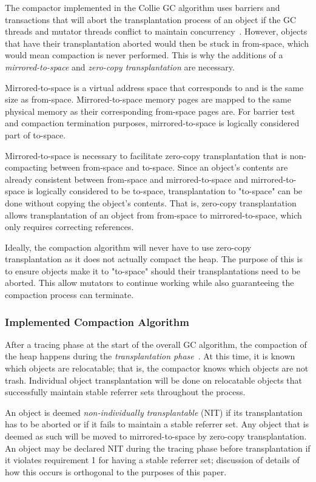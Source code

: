 \documentclass{sig-alternate}
\begin{document}
The compactor implemented in the Collie GC algorithm uses barriers 
and transactions that will abort the transplantation process of an object if the
GC threads and mutator threads conflict to maintain concurrency~\cite{Iyengar:Collie}.
However, objects that have their transplantation aborted would then be stuck
in from-space, which would mean compaction is never performed. This is why
the additions of a \emph{mirrored-to-space} and \emph{zero-copy transplantation} are necessary.

Mirrored-to-space is a virtual address space that corresponds to and is the same
size as from-space. Mirrored-to-space memory pages are mapped to the same physical
memory as their corresponding from-space pages are. For barrier test and compaction 
termination purposes, mirrored-to-space is logically considered part of to-space.

Mirrored-to-space is necessary to facilitate zero-copy transplantation that is 
non-compacting between from-space and to-space. Since an object's contents are 
already consistent between from-space and mirrored-to-space and mirrored-to-space
is logically considered to be to-space, transplantation to "to-space"
can be done without copying the object's contents. That is, zero-copy transplantation
allows transplantation of an object from from-space to mirrored-to-space, which only
requires correcting references.

Ideally, the compaction algorithm will never have to use zero-copy transplantation
as it does not actually compact the heap. The purpose of this is to ensure
objects make it to "to-space" should their transplantations need to be aborted. 
This allow mutators to continue working while also guaranteeing the compaction 
process can terminate.


\subsubsection{Implemented Compaction Algorithm}
\label{sec:collieAlgorithmImplementation}

After a tracing phase at the start of the overall GC algorithm, the compaction of
the heap happens during the \emph{transplantation phase}~\cite{Iyengar:Collie}.
At this time, it is known which objects are relocatable; that is, the compactor knows which 
objects are not trash. Individual object transplantation will be done on relocatable objects 
that successfully maintain stable referrer sets throughout the process.

An object is deemed \emph{non-individually transplantable} (NIT) if its transplantation
has to be aborted or if it fails to maintain a stable referrer set. 
Any object that is deemed as such will be moved to mirrored-to-space by zero-copy 
transplantation. An object may be declared NIT during the tracing phase before transplantation
if it violates requirement 1 for having a stable referrer set; discussion of details
of how this occurs is orthogonal to the purposes of this paper.
\end{document}
